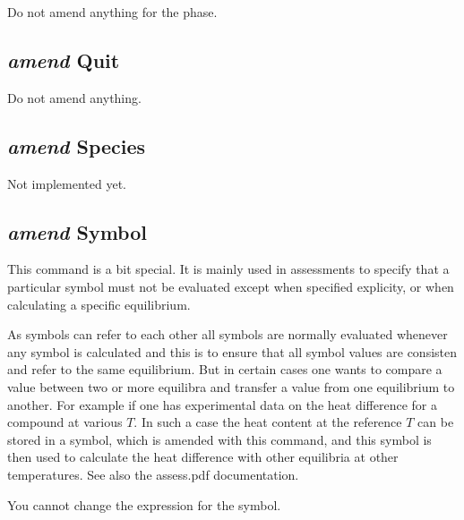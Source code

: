 \documentclass[12pt]{article}
\begin{document}
Do not amend anything for the phase.

\subsection{{\em amend} Quit}

Do not amend anything.

\subsection{{\em amend} Species}

Not implemented yet.

\subsection{{\em amend} Symbol}

This command is a bit special.  It is mainly used in assessments to
specify that a particular symbol must not be evaluated except when 
specified explicity, or when calculating a specific equilibrium.

As symbols can refer to each other all symbols are normally evaluated
whenever any symbol is calculated and this is to ensure that all
symbol values are consisten and refer to the same equilibrium.  But in
certain cases one wants to compare a value between two or more
equilibra and transfer a value from one equilibrium to another.  For
example if one has experimental data on the heat difference for a
compound at various $T$.  In such a case the heat content at the
reference $T$ can be stored in a symbol, which is amended with this
command, and this symbol is then used to calculate the heat difference
with other equilibria at other temperatures.  See also the assess.pdf
documentation.

You cannot change the expression for the symbol.
\end{document}
